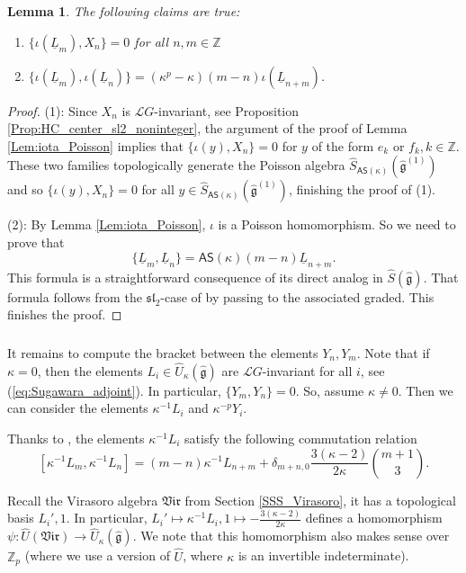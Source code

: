 \documentclass{amsart}
\newtheorem{Lem}[Thm]{Lemma}
\theoremstyle{definition}
\newcommand{\slf}{\mathfrak{sl}}
\newcommand{\sss}{\subsubsection{}}
\newcommand{\Ring}{\mathsf{R}}
\newcommand{\hg}{\hat{\mathfrak{g}}}
\newcommand{\Z}{\mathbb{Z}}
\newcommand{\Loop}{\mathscr{L}}
\newcommand{\AS}{\mathsf{AS}}
\numberwithin{equation}{section}
\begin{document}
\begin{Lem}\label{Lem:Poisson_brackets1}
The following claims are true:
\begin{enumerate}
\item $\{\iota(\underline{L}_m),X_n\}=0$ for all $n,m\in \Z$
\item $\{\iota(\underline{L}_m),\iota(\underline{L}_n)\}=(\kappa^p-\kappa)(m-n)\iota(\underline{L}_{n+m})$.
\end{enumerate}
\end{Lem}
\begin{proof}
(1): Since $X_n$ is $\Loop G$-invariant,  see Proposition \ref{Prop:HC_center_sl2_noninteger}, the argument of the proof of 
Lemma \ref{Lem:iota_Poisson} implies that $\{\iota(y), X_n\}=0$
for $y$ of the form $e_{k}$ or $f_{k}, k\in \Z$. These two families topologically generate the Poisson algebra $\widehat{S}_{\AS(\kappa)}(\hg^{(1)})$  and so $\{\iota(y), X_n\}=0$ for all
$y\in \widehat{S}_{\AS(\kappa)}(\hg^{(1)})$, finishing the proof of (1).

(2): By Lemma \ref{Lem:iota_Poisson}, $\iota$ is a Poisson homomorphism.
So we need to prove that 
$$\{\underline{L}_m,\underline{L}_n\}=\AS(\kappa)(m-n)\underline{L}_{n+m}.$$
This formula is a straightforward consequence of its direct analog in $\widehat{S}(\hg)$.
That formula follows from the $\slf_2$-case of \cite[(12.8.8)]{Kac} by passing to the associated graded. This finishes the proof.
\end{proof}

\sss\label{SSS:Virasoro_computation}
It remains to compute the bracket between the elements $Y_n,Y_m$. Note that if $\kappa=0$, then the elements $L_i\in \widehat{U}_\kappa(\hg)$
are $\Loop G$-invariant for all $i$, see (\ref{eq:Sugawara_adjoint}). In particular, $\{Y_m,Y_n\}=0$. So, assume $\kappa\neq 0$. Then we can consider the elements $\kappa^{-1}L_i$ and $\kappa^{-p}Y_i$. 

Thanks to \cite[(12.8.8)]{Kac}, the elements $\kappa^{-1}L_i$ satisfy the following commutation relation
\begin{equation}\label{eq:Virasoro_commutation}
[\kappa^{-1}L_m,\kappa^{-1}L_n]=(m-n)\kappa^{-1}L_{n+m}+\delta_{m+n,0}\frac{3(\kappa-2)}{2\kappa}{m+1\choose 3}.
\end{equation}

Recall the Virasoro algebra $\mathfrak{Vir}$ from Section \ref{SSS_Virasoro}, it has a topological basis $L_i', 1$. In particular, $L_i'\mapsto \kappa^{-1}L_i, 1\mapsto -\frac{3(\kappa-2)}{2\kappa}$ defines a homomorphism $\psi:\widehat{U}(\mathfrak{Vir})\rightarrow \widehat{U}_\kappa(\hg)$. We note that this homomorphism also makes sense over $\Z_p$ (where we use a version of $\widehat{U}$, where $\kappa$ is an invertible indeterminate).
\end{document}
